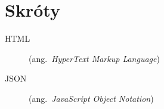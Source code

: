 \chapter*{Skróty}\mbox{}
\label{sec:skroty}
\noindent
\begin{description}
  \item [HTML]    (ang.\ \emph{HyperText Markup Language})
  \item [JSON]    (ang.\ \emph{JavaScript Object Notation})
\end{description}
